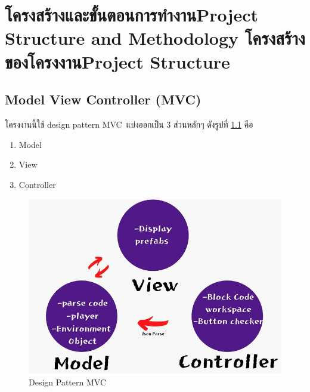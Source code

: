 \chapter{\ifproject%
\ifcpe โครงสร้างและขั้นตอนการทำงาน\else Project Structure and Methodology\fi
\else%
\ifcpe โครงสร้างของโครงงาน\else Project Structure\fi
\fi
}


\makeatletter


\makeatother

\section{Model View Controller (MVC)}
โครงงานนี้ใช้ design pattern MVC~\cite{mvc}แบ่งออกเป็น 3 ส่วนหลักๆ ดังรูปที่ \ref{mvc} คือ 
\begin{enumerate}
    \item Model
    \item View
    \item Controller
\end{enumerate}

\begin{figure}
\begin{center}
\includegraphics{pic/pic1.jpg}
\end{center}
\caption[Design Pattern MVC]{Design Pattern MVC}
\label{mvc}
\end{figure}

